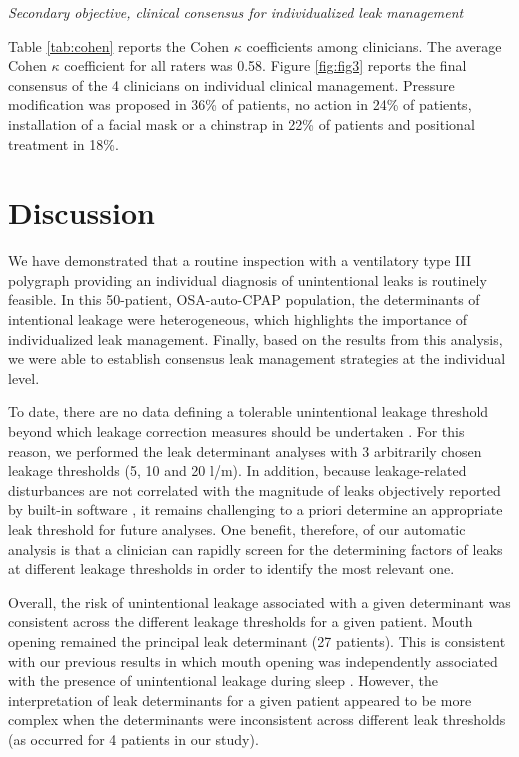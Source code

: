 \textit{Secondary objective, clinical consensus for individualized leak management}

Table \ref{tab:cohen} reports the Cohen $\kappa$ coefficients among clinicians. The average Cohen $\kappa$ coefficient for all raters was 0.58. Figure \ref{fig:fig3} reports the final consensus of the 4 clinicians on individual clinical management. Pressure modification was proposed in 36\% of patients, no action in 24\% of patients, installation of a facial mask or a chinstrap in 22\% of patients and positional treatment in 18\%.

\section{Discussion}

We have demonstrated that a routine inspection with a ventilatory type III polygraph providing an individual diagnosis of unintentional leaks is routinely feasible. In this 50-patient, OSA-auto-CPAP population, the determinants of intentional leakage were heterogeneous, which highlights the importance of individualized leak management. Finally, based on the results from this analysis, we were able to establish consensus leak management strategies at the individual level.

To date, there are no data defining a tolerable unintentional leakage threshold beyond which leakage correction measures should be undertaken \citep{schwab, valentin}. For this reason, we performed the leak determinant analyses with 3 arbitrarily chosen leakage thresholds (5, 10 and 20 l/m). In addition, because leakage-related disturbances are not correlated with the magnitude of leaks objectively reported by built-in software \citep{bachour2013}, it remains challenging to a priori determine an appropriate leak threshold for future analyses. One benefit, therefore, of our automatic analysis is that a clinician can rapidly screen for the determining factors of leaks at different leakage thresholds in order to identify the most relevant one.

Overall, the risk of unintentional leakage associated with a given determinant was consistent across the different leakage thresholds for a given patient. Mouth opening remained the principal leak determinant (27 patients). This is consistent with our previous results in which mouth opening was independently associated with the presence of unintentional leakage during sleep \citep{lebret2018}. However, the interpretation of leak determinants for a given patient appeared to be more complex when the determinants were inconsistent across different leak thresholds (as occurred for 4 patients in our study).


